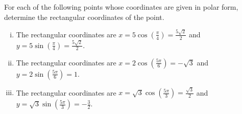 \begin{activitySolution}
\begin{enumerate}[i.]
        \end{enumerate}

	\item For each of the following points whose coordinates are given in polar form, determine the rectangular coordinates of the point.
       \begin{enumerate}[i.]
          \item The rectangular coordinates are $x = 5 \cos\left(\frac{\pi}{4}\right) = \frac{5\sqrt{2}}{2}$ and $y = 5 \sin\left(\frac{\pi}{4}\right) = \frac{5\sqrt{2}}{2}$.
         \item  The rectangular coordinates are $x = 2 \cos\left(\frac{5\pi}{6}\right) = -\sqrt{3}$ and $y = 2 \sin\left(\frac{5\pi}{6}\right) = 1$.
		\item The rectangular coordinates are $x = \sqrt{3} \cos\left(\frac{5\pi}{3}\right) = \frac{\sqrt{3}}{2}$ and $y = \sqrt{3} \sin\left(\frac{5\pi}{3}\right) = -\frac{3}{2}$. 
       \end{enumerate}

    \ea


\end{activitySolution} 

\afterpa 